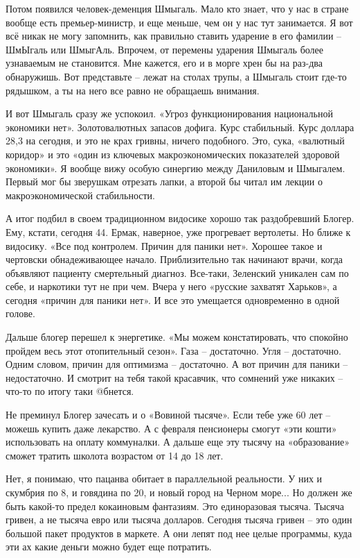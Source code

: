 Потом появился человек-деменция Шмыгаль. Мало кто знает, что у нас в стране
вообще есть премьер-министр, и еще меньше, чем он у нас тут занимается. Я вот
всё никак не могу запомнить, как правильно ставить ударение в его фамилии –
ШмЫгаль или ШмыгАль. Впрочем, от перемены ударения Шмыгаль более узнаваемым не
становится. Мне кажется, его и в морге хрен бы на раз-два обнаружишь. Вот
представьте – лежат на столах трупы, а Шмыгаль стоит где-то рядышком, а ты на
него все равно не обращаешь внимания.

И вот Шмыгаль сразу же успокоил. «Угроз функционирования национальной экономики
нет». Золотовалютных запасов дофига. Курс стабильный. Курс доллара 28,3 на
сегодня, и это не крах гривны, ничего подобного. Это, сука, «валютный коридор»
и это «один из ключевых макроэкономических показателей здоровой экономики». Я
вообще вижу особую синергию между Даниловым и Шмыгалем. Первый мог бы зверушкам
отрезать лапки, а второй бы читал им лекции о макроэкономической стабильности.

А итог подбил в своем традиционном видосике хорошо так раздобревший Блогер.
Ему, кстати, сегодня 44. Ермак, наверное, уже прогревает вертолеты. Но ближе к
видосику. «Все под контролем. Причин для паники нет». Хорошее такое и чертовски
обнадеживающее начало. Приблизительно так начинают врачи, когда объявляют
пациенту смертельный диагноз. Все-таки, Зеленский уникален сам по себе, и
наркотики тут не при чем. Вчера у него «русские захватят Харьков», а сегодня
«причин для паники нет». И все это умещается одновременно в одной голове.

Дальше блогер перешел к энергетике. «Мы можем констатировать, что спокойно
пройдем весь этот отопительный сезон». Газа – достаточно. Угля – достаточно.
Одним словом, причин для оптимизма – достаточно. А вот причин для паники –
недостаточно. И смотрит на тебя такой красавчик, что сомнений уже никаких –
что-то по итогу таки @бнется.

Не преминул Блогер зачесать и о «Вовиной тысяче». Если тебе уже 60 лет – можешь
купить даже лекарство. А с февраля пенсионеры смогут «эти кошти» использовать
на оплату коммуналки. А дальше еще эту тысячу на «образование» сможет тратить
школота возрастом от 14 до 18 лет.

Нет, я понимаю, что пацанва обитает в параллельной реальности. У них и скумбрия
по 8, и говядина по 20, и новый город на Черном море... Но должен же быть
какой-то предел кокаиновым фантазиям. Это единоразовая тысяча. Тысяча гривен, а
не тысяча евро или тысяча долларов. Сегодня тысяча гривен – это один большой
пакет продуктов в маркете. А они лепят под нее целые программы, куда эти ах
какие деньги можно будет еще потратить.
